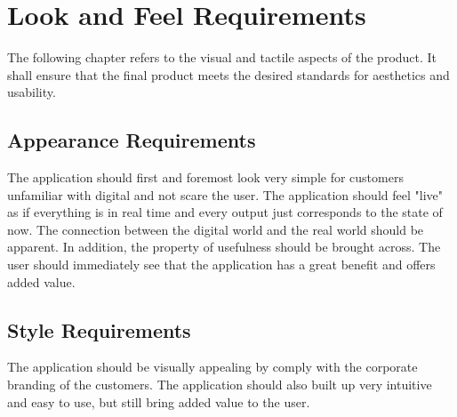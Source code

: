 \chapter{Look and Feel Requirements}
\label{chap:lookandfeel}

The following chapter refers to the visual and tactile aspects of the product. It shall ensure that the final product meets the desired standards for aesthetics and usability.
\section{Appearance Requirements}
The application should first and foremost look very simple for customers unfamiliar with digital and not scare the user.
The application should feel "live" as if everything is in real time and every output just corresponds to the state of now. 
The connection between the digital world and the real world should be apparent. 
In addition, the property of usefulness should be brought across. The user should immediately see that the application has a great benefit and offers added value.
\section{Style Requirements}
The application should be visually appealing by comply with the corporate branding of the customers.
The application should also built up very intuitive and easy to use, but still bring added value to the user.